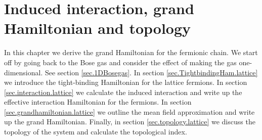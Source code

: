\chapter{Induced interaction, grand Hamiltonian and topology} %

\label{Chapter7} 

In this chapter we derive the grand Hamiltonian for the fermionic chain. We start off by going back to the Bose gas and consider the effect of making the gas one-dimensional. See section \ref{sec.1DBosegas}. In section \ref{sec.TightbindingHam.lattice} we introduce the tight-binding Hamiltonian for the lattice fermions. In section \ref{sec.interaction.lattice} we calculate the induced interaction and write up the effective interaction Hamiltonian for the fermions. In section \ref{sec.grandhamiltonian.lattice} we outline the mean field approximation and write up the grand Hamiltonian. Finally, in section \ref{sec.topology.lattice} we discuss the topology of the system and calculate the topological index.


